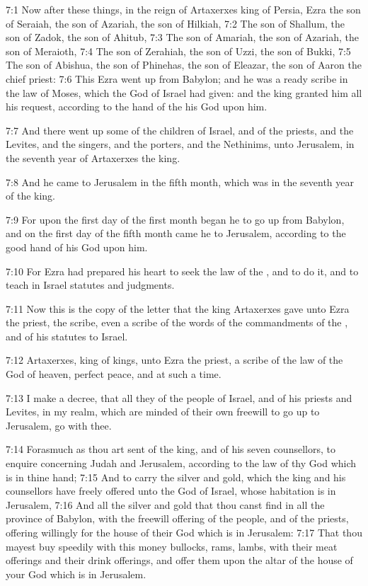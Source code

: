 7:1 Now after these things, in the reign of Artaxerxes king of Persia,
Ezra the son of Seraiah, the son of Azariah, the son of Hilkiah, 7:2
The son of Shallum, the son of Zadok, the son of Ahitub, 7:3 The son
of Amariah, the son of Azariah, the son of Meraioth, 7:4 The son of
Zerahiah, the son of Uzzi, the son of Bukki, 7:5 The son of Abishua,
the son of Phinehas, the son of Eleazar, the son of Aaron the chief
priest: 7:6 This Ezra went up from Babylon; and he was a ready scribe
in the law of Moses, which the \LORD God of Israel had given: and the
king granted him all his request, according to the hand of the \LORD
his God upon him.

7:7 And there went up some of the children of Israel, and of the
priests, and the Levites, and the singers, and the porters, and the
Nethinims, unto Jerusalem, in the seventh year of Artaxerxes the king.

7:8 And he came to Jerusalem in the fifth month, which was in the
seventh year of the king.

7:9 For upon the first day of the first month began he to go up from
Babylon, and on the first day of the fifth month came he to Jerusalem,
according to the good hand of his God upon him.

7:10 For Ezra had prepared his heart to seek the law of the \LORD, and
to do it, and to teach in Israel statutes and judgments.

7:11 Now this is the copy of the letter that the king Artaxerxes gave
unto Ezra the priest, the scribe, even a scribe of the words of the
commandments of the \LORD, and of his statutes to Israel.

7:12 Artaxerxes, king of kings, unto Ezra the priest, a scribe of the
law of the God of heaven, perfect peace, and at such a time.

7:13 I make a decree, that all they of the people of Israel, and of
his priests and Levites, in my realm, which are minded of their own
freewill to go up to Jerusalem, go with thee.

7:14 Forasmuch as thou art sent of the king, and of his seven
counsellors, to enquire concerning Judah and Jerusalem, according to
the law of thy God which is in thine hand; 7:15 And to carry the
silver and gold, which the king and his counsellors have freely
offered unto the God of Israel, whose habitation is in Jerusalem, 7:16
And all the silver and gold that thou canst find in all the province
of Babylon, with the freewill offering of the people, and of the
priests, offering willingly for the house of their God which is in
Jerusalem: 7:17 That thou mayest buy speedily with this money
bullocks, rams, lambs, with their meat offerings and their drink
offerings, and offer them upon the altar of the house of your God
which is in Jerusalem.


